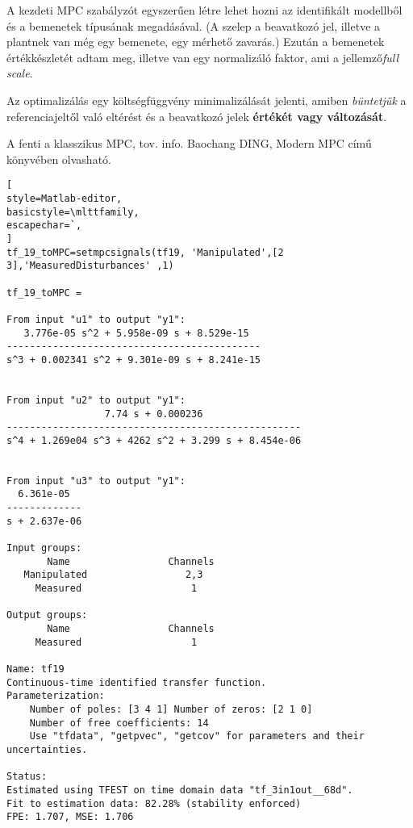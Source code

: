 A kezdeti MPC szabályzót egyszerűen létre lehet hozni az identifikált modellből és a bemenetek típusának megadásával. (A szelep a beavatkozó jel, illetve a plantnek van még egy bemenete, egy mérhető zavarás.) Ezután a bemenetek értékkészletét adtam meg, illetve van egy normalizáló faktor, ami a jellemző\textit{full scale}.

Az optimalizálás egy költségfüggvény minimalizálását jelenti, amiben \textit{büntetjük} a referenciajeltől való eltérést és a beavatkozó jelek \textbf{értékét vagy változását}.

A fenti a klasszikus MPC, tov. info. Baochang DING, Modern MPC című könyvében olvasható.


\begin{lstlisting}[
style=Matlab-editor,
basicstyle=\mlttfamily,
escapechar=`,
]
tf_19_toMPC=setmpcsignals(tf19, 'Manipulated',[2 3],'MeasuredDisturbances' ,1)

tf_19_toMPC =

From input "u1" to output "y1":
   3.776e-05 s^2 + 5.958e-09 s + 8.529e-15
--------------------------------------------
s^3 + 0.002341 s^2 + 9.301e-09 s + 8.241e-15


From input "u2" to output "y1":
                 7.74 s + 0.000236
---------------------------------------------------
s^4 + 1.269e04 s^3 + 4262 s^2 + 3.299 s + 8.454e-06


From input "u3" to output "y1":
  6.361e-05
-------------
s + 2.637e-06

Input groups:
       Name                 Channels
   Manipulated                 2,3
     Measured                   1

Output groups:
       Name                 Channels
     Measured                   1

Name: tf19
Continuous-time identified transfer function.
Parameterization:
    Number of poles: [3 4 1] Number of zeros: [2 1 0]
    Number of free coefficients: 14
    Use "tfdata", "getpvec", "getcov" for parameters and their uncertainties.

Status:
Estimated using TFEST on time domain data "tf_3in1out__68d".
Fit to estimation data: 82.28% (stability enforced)
FPE: 1.707, MSE: 1.706 



\end{lstlisting}
